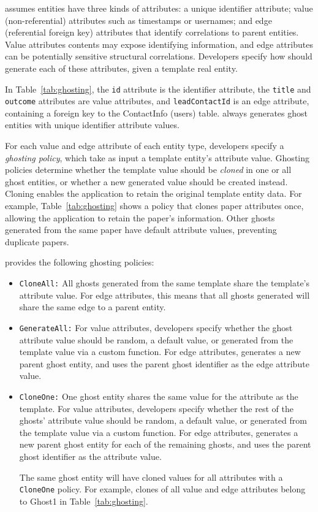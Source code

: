 \proto assumes entities have three kinds of attributes: a unique identifier attribute; value
(non-referential) attributes such as timestamps or usernames; and edge (referential foreign key)
attributes that identify correlations to parent entities.  Value attributes contents may expose
identifying information, and edge attributes can be potentially sensitive structural correlations.
Developers specify how \proto should generate each of these attributes, given a template real
entity.

In Table~\ref{tab:ghosting}, the \texttt{id} attribute is the identifier attribute, the
\texttt{title} and \texttt{outcome} attributes are value attributes, and \texttt{leadContactId} is
an edge attribute, containing a foreign key to the ContactInfo (users) table. 
\proto always generates ghost entities with unique identifier attribute values.

For each value and edge attribute of each entity type, developers specify a \emph{ghosting policy},
which take as input a template entity's attribute value.  Ghosting policies determine whether the
template value should be \emph{cloned} in one or all ghost entities, or whether
a new generated value should be created instead. Cloning enables the application to retain
the original template entity data. For example, Table~\ref{tab:ghosting} shows a policy that clones
paper attributes once, allowing the application to retain the paper's information. Other ghosts
generated from the same paper have default attribute values, preventing duplicate papers.

\proto provides the following ghosting policies:
\begin{itemize}
    \item \texttt{CloneAll:} All ghosts generated from the same template share the template's 
        attribute value. For edge attributes, this means that all ghosts generated will share the
        same edge to a parent entity.

    \item \texttt{GenerateAll:} 
        For value attributes, developers specify whether the ghost attribute value should be
        random, a default value, or generated from the template value via a custom function.
        For edge attributes, \proto generates a new parent ghost entity, and uses the parent ghost
        identifier as the edge attribute value.

    \item \texttt{CloneOne:} One ghost entity shares the same value for the attribute as the
        template. For value attributes, developers specify whether the rest of the ghosts' attribute
        value should be random, a default value, or generated from the template value via a custom
        function.  For edge attributes, \proto generates a new parent ghost entity for each of the
        remaining ghosts, and uses the parent ghost identifier as the attribute value.

        The same ghost entity will have cloned values for all attributes with a
        \texttt{CloneOne} policy. For example, clones of all value and edge attributes belong to
        Ghost1 in Table~\ref{tab:ghosting}.
\end{itemize}

